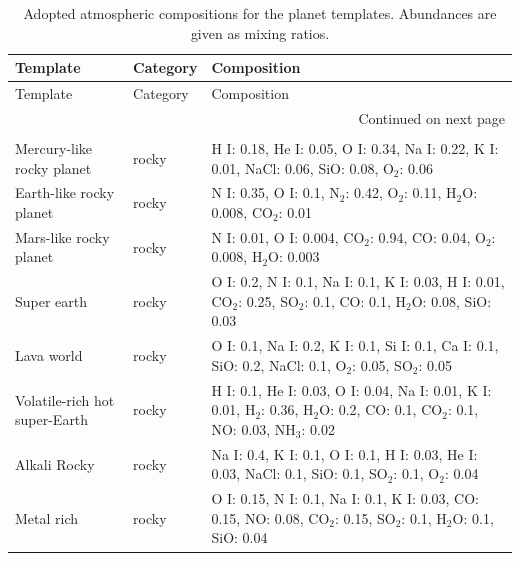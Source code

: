 \begin{longtable}{lll}
\caption{Adopted atmospheric compositions for the planet templates. Abundances are given as mixing ratios.}\label{tab:planet_templates_compositions} \\
\toprule
Template & Category & Composition \\
\midrule
\endfirsthead

\toprule
Template & Category & Composition \\
\midrule
\endhead

\midrule
\multicolumn{3}{r}{Continued on next page} \\
\midrule
\endfoot

\bottomrule
\endlastfoot

\multicolumn{3}{l}{\textbf{Rocky / terrestrial templates}} \\
\midrule
Mercury-like rocky planet & rocky & H I: 0.18, He I: 0.05, O I: 0.34, Na I: 0.22, K I: 0.01, NaCl: 0.06, SiO: 0.08, O$_{2}$: 0.06 \\
Earth-like rocky planet & rocky & N I: 0.35, O I: 0.1, N$_{2}$: 0.42, O$_{2}$: 0.11, H$_{2}$O: 0.008, CO$_{2}$: 0.01 \\
Mars-like rocky planet & rocky & N I: 0.01, O I: 0.004, CO$_{2}$: 0.94, CO: 0.04, O$_{2}$: 0.008, H$_{2}$O: 0.003 \\
Super earth & rocky & O I: 0.2, N I: 0.1, Na I: 0.1, K I: 0.03, H I: 0.01, CO$_{2}$: 0.25, SO$_{2}$: 0.1, CO: 0.1, H$_{2}$O: 0.08, SiO: 0.03 \\
Lava world & rocky & O I: 0.1, Na I: 0.2, K I: 0.1, Si I: 0.1, Ca I: 0.1, SiO: 0.2, NaCl: 0.1, O$_{2}$: 0.05, SO$_{2}$: 0.05 \\
Volatile-rich hot super-Earth & rocky & H I: 0.1, He I: 0.03, O I: 0.04, Na I: 0.01, K I: 0.01, H$_{2}$: 0.36, H$_{2}$O: 0.2, CO: 0.1, CO$_{2}$: 0.1, NO: 0.03, NH$_{3}$: 0.02 \\
Alkali Rocky & rocky & Na I: 0.4, K I: 0.1, O I: 0.1, H I: 0.03, He I: 0.03, NaCl: 0.1, SiO: 0.1, SO$_{2}$: 0.1, O$_{2}$: 0.04 \\
Metal rich & rocky & O I: 0.15, N I: 0.1, Na I: 0.1, K I: 0.03, CO: 0.15, NO: 0.08, CO$_{2}$: 0.15, SO$_{2}$: 0.1, H$_{2}$O: 0.1, SiO: 0.04 \\
\midrule


\end{longtable}
